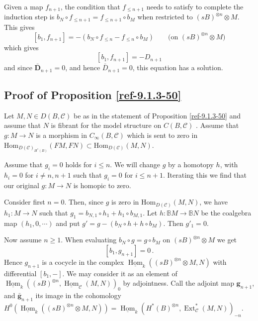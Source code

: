 \documentclass{amsart}
\numberwithin{equation}{section}
\let\cal\mathcal
\theoremstyle{definition}
\theoremstyle{remark}
\let\mathscr\mathcal
\begin{document}
Given a map $f_{n+1}$, the condition that $f_{\leq n+1}$ needs to
satisfy to complete the induction step is $b_N \circ f_{\leq
  n+1}=f_{\leq n+1}\circ b_M$ when restricted to $(sB)^{\otimes
  n}\otimes M$. 
 This gives
\[
[b_1,f_{n+1}]=-(b_N\circ f_{\leq n}-f_{\leq n}\circ b_M)\qquad\text{(on $(sB)^{\otimes n}\otimes M$)}
\]
which gives
\[[b_1,f_{n+1}]=-D_{n+1}\]
and since $\bar{\textbf{D}}_{n+1}=0$, and hence $\bar{D}_{n+1}=0$, this equation has a solution.{}

\subsection{Proof of Proposition \ref{ref-9.1.3-50}}
Let $M,N\in D(B, \mathscr{C})$ be as in the statement of Proposition \ref{ref-9.1.3-50} and
assume that $N$ is fibrant for the model structure on $C(B,{{\cal C}})$ \cite[Prop.\ 5.1]{lowenvdb2}. Assume that $g:M{\rightarrow} N$ is a morphism in $C_\infty(B,{{\cal C}})$ which
is sent to zero in 
$\mathrm{Hom}_{D(\mathscr{C})_{H^\ast(B)}}
(FM,FN)
\subset \mathrm{Hom}_{D(\mathscr{C})}(M,N)$. 

Assume that $g_i=0$ holds for $i\leq n$. We will change $g$ by a
homotopy $h$, with $h_i=0$ for $i\neq n,n+1$ such that $g_i=0$ for $i\le n+1$. Iterating this we
find that our original $g:M{\rightarrow} N$ is homopic to zero.

Consider first $n=0$. Then, since $g$ is zero in $\mathrm{Hom}_{D(\mathscr{C})}(M,N)$, we have
$h_1:M{\rightarrow} N$ such that $g_1=b_{N,1}\circ h_1+h_1\circ b_{M,1}$. Let
$h:{\mathbb{B}} M{\rightarrow} {\mathbb{B}} N$ be the coalgebra map $(h_1,0,\cdots)$ and put
$g'=g-(b_N\circ h+h\circ b_M)$. Then $g'_1=0$.

Now assume $n\ge 1$.
When evaluating $b_N\circ g=g\circ b_M$ on $(sB)^{\otimes n}\otimes M$ we get
\[[b_1,g_{n+1}]=0\,.\]
Hence $g_{n+1}$ is a cocycle in the complex
$\underline{\operatorname {Hom}}_k((sB)^{\otimes n}\otimes M,N)$ with differential
$[b_1,-]$. We may consider it as an element of
$\underline{\operatorname {Hom}}_k((sB)^{\otimes n},\underline{\operatorname {Hom}}_{{\cal C}}(M,N))_{0}$ by adjointness. Call the
adjoint map $\textbf{g}_{n+1}$, and $\bar{\textbf{g}}_{n+1}$ its image
in the cohomology $H^0(\underline{\operatorname {Hom}}_k((sB)^{\otimes n}\otimes
M,N))=\underline{\operatorname {Hom}}_k(H^*(B)^{\otimes n},{\operatorname {Ext}}^*_{{\cal C}}(M,N))_{-n}$.
\end{document}
